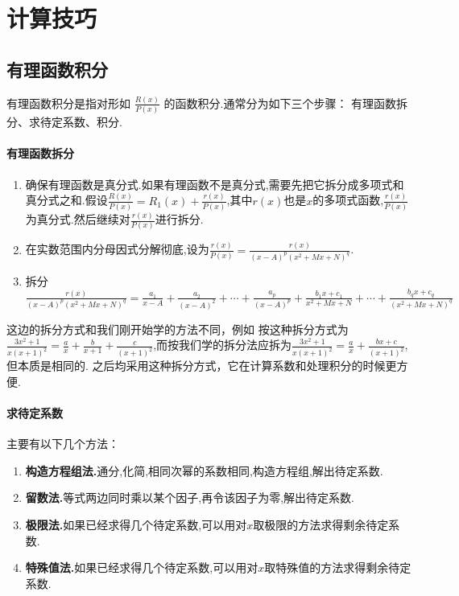 \chapter{计算技巧}
\section{有理函数积分}
有理函数积分是指对形如 $\frac{R(x)}{P(x)}$ 的函数积分.通常分为如下三个步骤：
有理函数拆分、求待定系数、积分.
\vspace{-1em}
\subsubsection*{有理函数拆分}

\begin{enumerate}
    \item 确保有理函数是真分式.如果有理函数不是真分式,需要先把它拆分成多项式和真分式之和.假设$\frac{R(x)}{P(x)}=R_1(x)+\frac{r(x)}{P(x)}$,其中$r(x)$也是$x$的多项式函数,$\frac{r(x)}{P(x)}$为真分式.然后继续对$\frac{r(x)}{P(x)}$进行拆分.
    \item 在实数范围内分母因式分解彻底,设为$\frac{r(x)}{P(x)}=\frac{r(x)}{(x-A)^p(x^2+Mx+N)^q}$.
    \item 拆分$\frac{r(x)}{(x-A)^p(x^2+Mx+N)^q}  = \frac{a_1}{x-A} + \frac{a_2}{(x-A)^2} + \cdots + \frac{a_p}{(x-A)^p} + \frac{b_1x+c_1}{x^2+Mx+N} + \cdots + \frac{b_qx+c_q}{(x^2+Mx+N)^q} $
\end{enumerate}

\begin{note}
    这边的拆分方式和我们刚开始学的方法不同，例如 按这种拆分方式为$\frac{3x^2 +1}{x(x+1)^2} = \frac a x + \frac{b}{x+1} + \frac{c}{(x+1)^2}$,而按我们学的拆分法应拆为$\frac{3x^2 +1}{x(x+1)^2} = \frac a x + \frac{bx+c}{(x+1)^2}$,但本质是相同的.
    之后均采用这种拆分方式，它在计算系数和处理积分的时候更方便.
\end{note}
\vspace{-1em}
\subsubsection*{求待定系数}
主要有以下几个方法：
\begin{enumerate}
    \item \textbf{构造方程组法.}通分,化简,相同次幂的系数相同,构造方程组,解出待定系数.
    \item \textbf{留数法.}等式两边同时乘以某个因子,再令该因子为零,解出待定系数.
    \item \textbf{极限法.}如果已经求得几个待定系数,可以用对$x$取极限的方法求得剩余待定系数.
    \item \textbf{特殊值法.}如果已经求得几个待定系数,可以用对$x$取特殊值的方法求得剩余待定系数.
\end{enumerate}

